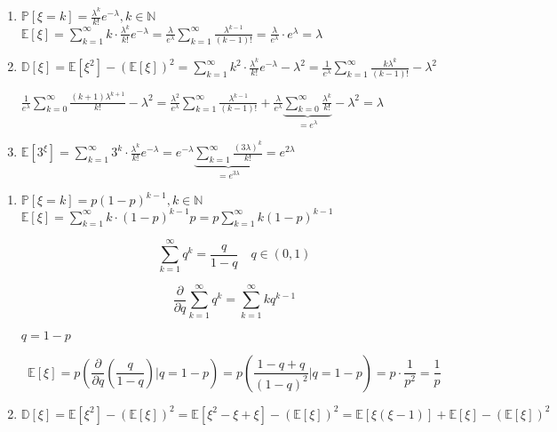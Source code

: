 \begin{solution}
	\begin{enumerate}
		\begin{enumerate}
			\item
			
			
			$\mathbb{P}[\xi=k]=\frac{\lambda^{k}}{k !} e^{-\lambda}, k \in \mathbb{N}$ \\
			$\mathbb{E}[\xi]=\sum_{k=1}^{\infty} k \cdot \frac{\lambda^{k}}{k !} e^{-\lambda}=\frac{\lambda}{e^{\lambda}} \sum_{k=1}^{\infty} \frac{\lambda^{k-1}}{(k-1) !}=\frac{\lambda}{e^{\lambda}} \cdot e^{\lambda}=\lambda$ \\
			\item
			$\mathbb{D}[\xi]=\mathbb{E}\left[\xi^{2}\right]-(\mathbb{E}[\xi])^{2}=\sum_{k=1}^{\infty} k^{2} \cdot \frac{\lambda^{k}}{k !} e^{-\lambda}-\lambda^{2}=\frac{1}{e^{\lambda}} \sum_{k=1}^{\infty} \frac{k \lambda^{k}}{(k-1) !}-\lambda^{2}$
			
			$\frac{1}{e^{\lambda}} \sum_{k=0}^{\infty} \frac{(k+1) \lambda^{k+1}}{k !}-\lambda^{2}=\frac{\lambda^{2}}{e^{\lambda}} \sum_{k=1}^{\infty} \frac{\lambda^{k-1}}{(k-1) !}+\frac{\lambda}{e^{\lambda}} \underbrace{\sum_{k=0}^{\infty} \frac{\lambda^{k}}{k !}}_{=e^{\lambda}}-\lambda^{2}=\lambda$
			
			\item
			$\mathbb{E}\left[3^{\xi}\right]=\sum_{k=1}^{\infty} 3^{k} \cdot \frac{\lambda^{k}}{k !} e^{-\lambda}=e^{-\lambda} \underbrace{\sum_{k=1}^{\infty} \frac{(3 \lambda)^{k}}{k !}}_{=e^{3 \lambda}}=e^{2 \lambda}$
		\end{enumerate}
	
	\begin{enumerate}
		\item 
		$\mathbb{P}[\xi=k]=p(1-p)^{k-1}, k \in \mathbb{N}$
		$\mathbb{E}[\xi]=\sum_{k=1}^{\infty} k \cdot(1-p)^{k-1} p=p \sum_{k=1}^{\infty} k(1-p)^{k-1}$
		
		$$
		\sum_{k=1}^{\infty} q^{k}=\frac{q}{1-q} \quad q \in(0,1)
		$$
		
		$$
		\frac{\partial}{\partial q} \sum_{k=1}^{\infty} q^{k}=\sum_{k=1}^{\infty} k q^{k-1}
		$$
		
		$q=1-p$
		
		$$
		\mathbb{E}[\xi]=p\left(\frac{\partial}{\partial q}\left(\frac{q}{1-q}\right) | q=1-p\right)=p\left(\frac{1-q+q}{(1-q)^{2}} | q=1-p\right)=p \cdot \frac{1}{p^{2}}=\frac{1}{p}
		$$
		
		\item 
		$$
		\mathbb{D}[\xi]=\mathbb{E}\left[\xi^{2}\right]-(\mathbb{E}[\xi])^{2}=\mathbb{E}\left[\xi^{2}-\xi+\xi\right]-(\mathbb{E}[\xi])^{2}=\mathbb{E}[\xi(\xi-1)]+\mathbb{E}[\xi]-(\mathbb{E}[\xi])^{2}
		$$
		

\end{enumerate}
\end{enumerate}
\end{solution}
